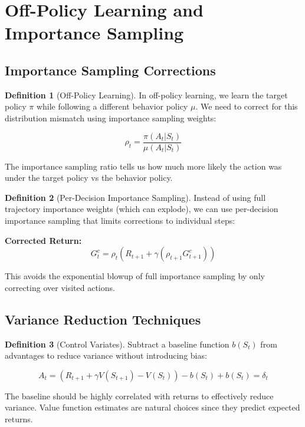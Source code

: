 \documentclass[12pt,a4paper]{article}
\theoremstyle{definition}
\newtheorem{definition}{Definition}[section]
\begin{document}
\section{Off-Policy Learning and Importance Sampling}

\subsection{Importance Sampling Corrections}

\begin{definition}[Off-Policy Learning]
In off-policy learning, we learn the target policy $\pi$ while following a different behavior policy $\mu$. We need to correct for this distribution mismatch using importance sampling weights:

\[
\rho_t = \frac{\pi(A_t|S_t)}{\mu(A_t|S_t)}
\]

The importance sampling ratio tells us how much more likely the action was under the target policy vs the behavior policy.
\end{definition}

\begin{definition}[Per-Decision Importance Sampling]
Instead of using full trajectory importance weights (which can explode), we can use per-decision importance sampling that limits corrections to individual steps:

\textbf{Corrected Return:}
\[
G_t^c = \rho_t (R_{t+1} + \gamma (\rho_{t+1} G_{t+1}^c))
\]

This avoids the exponential blowup of full importance sampling by only correcting over visited actions.
\end{definition}

\subsection{Variance Reduction Techniques}

\begin{definition}[Control Variates]
Subtract a baseline function $b(S_t)$ from advantages to reduce variance without introducing bias:

\[
A_t = (R_{t+1} + \gamma V(S_{t+1}) - V(S_t)) - b(S_t) + b(S_t) = \delta_t
\]

The baseline should be highly correlated with returns to effectively reduce variance. Value function estimates are natural choices since they predict expected returns.
\end{definition}
\end{document}
